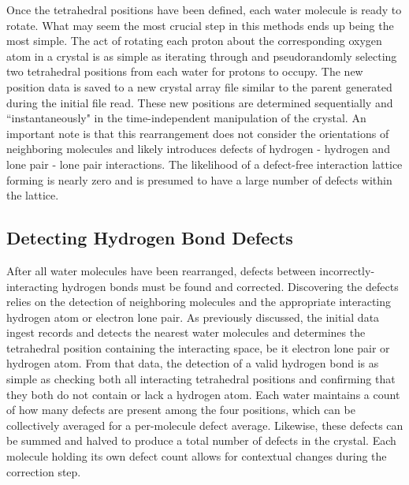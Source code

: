 Once the tetrahedral positions have been defined, each water molecule is ready to rotate.
What may seem the most crucial step in this methods ends up being the most simple.
The act of rotating each proton about the corresponding oxygen atom in a crystal is as simple as iterating through and pseudorandomly selecting two tetrahedral positions from each water for protons to occupy.
The new position data is saved to a new crystal array file similar to the parent generated during the initial file read.
These new positions are determined sequentially and ``instantaneously" in the time-independent manipulation of the crystal.
An important note is that this rearrangement does not consider the orientations of neighboring molecules and likely introduces defects of hydrogen - hydrogen and lone pair - lone pair interactions.
The likelihood of a defect-free interaction lattice forming is nearly zero and is presumed to have a large number of defects within the lattice. 


\subsection{Detecting Hydrogen Bond Defects}

After all water molecules have been rearranged, defects between incorrectly-interacting hydrogen bonds must be found and corrected.
Discovering the defects relies on the detection of neighboring molecules and the appropriate interacting hydrogen atom or electron lone pair. 
As previously discussed, the initial data ingest records and detects the nearest water molecules and determines the tetrahedral position containing the interacting space, be it electron lone pair or hydrogen atom. 
From that data, the detection of a valid hydrogen bond is as simple as checking both all interacting tetrahedral positions and confirming that they both do not contain or lack a hydrogen atom.
Each water maintains a count of how many defects are present among the four positions, which can be collectively averaged for a per-molecule defect average.
Likewise, these defects can be summed and halved to produce a total number of defects in the crystal. 
Each molecule holding its own defect count allows for contextual changes during the correction step.


